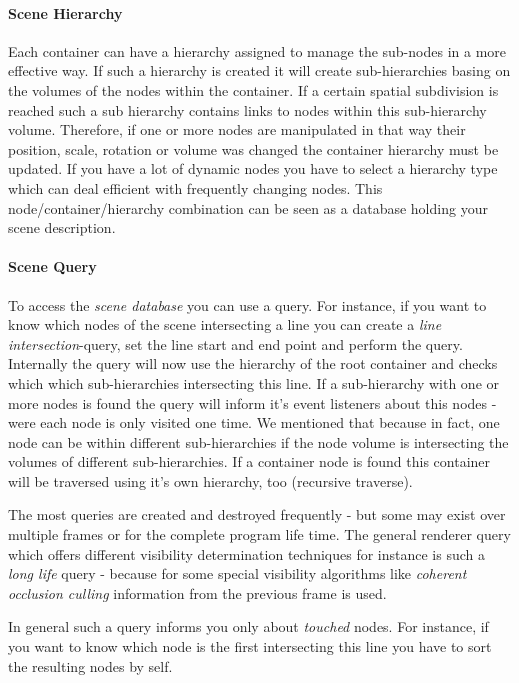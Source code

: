 \paragraph{Scene Hierarchy}
Each container can have a hierarchy assigned to manage the sub-nodes in a more effective way. If such a hierarchy is created it will create sub-hierarchies basing on the volumes of the nodes within the container. If a certain spatial subdivision is reached such a sub hierarchy contains links to nodes within this sub-hierarchy volume. Therefore, if one or more nodes are manipulated in that way their position, scale, rotation or volume was changed the container hierarchy must be updated. If you have a lot of dynamic nodes you have to select a hierarchy type which can deal efficient with frequently changing nodes. This node/container/hierarchy combination can be seen as a database holding your scene description.


\paragraph{Scene Query}
To access the \emph{scene database} you can use a query. For instance, if you want to know which nodes of the scene intersecting a line you can create a \emph{line intersection}-query, set the line start and end point and perform the query. Internally the query will now use the hierarchy of the root container and checks which which sub-hierarchies intersecting this line. If a sub-hierarchy with one or more nodes is found the query will inform it's event listeners about this nodes - were each node is only visited one time. We mentioned that because in fact, one node can be within different sub-hierarchies if the node volume is intersecting the volumes of different sub-hierarchies. If a container node is found this container will be traversed using it's own hierarchy, too (recursive traverse).

The most queries are created and destroyed frequently - but some may exist over multiple frames or for the complete program life time. The general renderer query which offers different visibility determination techniques for instance is such a \emph{long life} query - because for some special visibility algorithms like \emph{coherent occlusion culling} information from the previous frame is used.

In general such a query informs you only about \emph{touched} nodes. For instance, if you want to know which node is the first intersecting this line you have to sort the resulting nodes by self.


